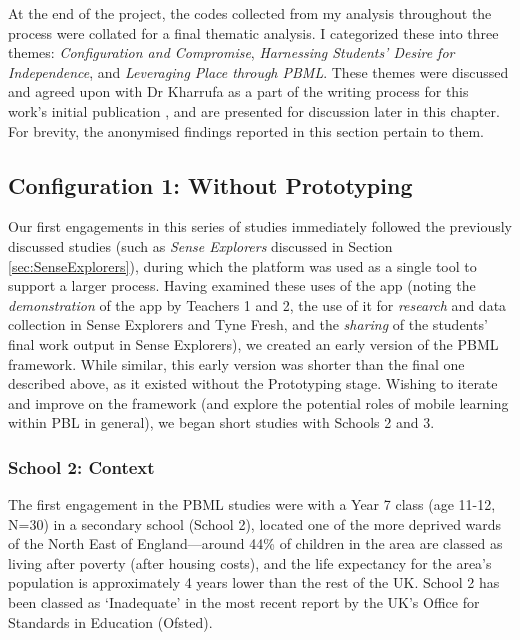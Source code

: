 At the end of the project, the codes collected from my analysis throughout the process were collated for a final thematic analysis. I categorized these into three themes: \textit{Configuration and Compromise}, \textit{Harnessing Students' Desire for Independence}, and \textit{Leveraging Place through PBML}. These themes were discussed and agreed upon with Dr Kharrufa as a part of the writing process for this work's initial publication \citep{Richardson2020}, and are presented for discussion later in this chapter. For brevity, the anonymised findings reported in this section pertain to them.

\subsection{Configuration 1: Without Prototyping}

Our first engagements in this series of studies immediately followed the previously discussed studies (such as \textit{Sense Explorers} discussed in Section \ref{sec:SenseExplorers}), during which the platform was used as a single tool to support a larger process. Having examined these uses of the app (noting the \textit{demonstration} of the app by Teachers 1 and 2, the use of it for \textit{research} and data collection in Sense Explorers and Tyne Fresh, and the \textit{sharing} of the students' final work output in Sense Explorers), we created an early version of the PBML framework. While similar, this early version was shorter than the final one described above, as it existed without the Prototyping stage. Wishing to iterate and improve on the framework (and explore the potential roles of mobile learning within PBL in general), we began short studies with Schools 2 and 3.

\subsubsection{School 2: Context}

The first engagement in the PBML studies were with a Year 7 class (age 11-12, N=30) in a secondary school (School 2), located one of the more deprived wards of the North East of England---around 44\% of children in the area are classed as living after poverty (after housing costs), and the life expectancy for the area's population is approximately 4 years lower than the rest of the UK. School 2 has been classed as `Inadequate' in the most recent report by the UK's Office for Standards in Education (Ofsted).

